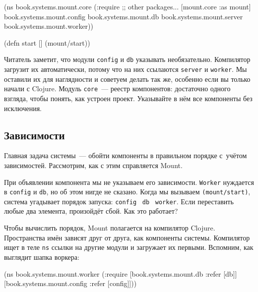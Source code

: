\label{mount-main}

\begin{english}
  \begin{clojure}
(ns book.systems.mount.core
  (:require
   ;; other packages...
   [mount.core :as mount]
   book.systems.mount.config
   book.systems.mount.db
   book.systems.mount.server
   book.systems.mount.worker))

(defn start []
  (mount/start))
  \end{clojure}
\end{english}

Читатель заметит, что модули \verb|config| и \verb|db| указывать
необязательно. Компилятор загрузит их автоматически, потому что на них ссылаются
\verb|server| и \verb|worker|. Мы оставили их для наглядности и советуем делать
так же, особенно если вы только начали с Clojure. Модуль \verb|core|~--- реестр
компонентов: достаточно одного взгляда, чтобы понять, как устроен
проект. Указывайте в нём все компоненты без исключения.

\subsection{Зависимости}


Главная задача системы~--- обойти компоненты в правильном порядке с~учётом
зависимостей. Рассмотрим, как с этим справляется Mount.

При объявлении компонента мы не указываем его зависимости. \verb|Worker|
нуждается в \verb|config| и \verb|db|, но об этом нигде не сказано. Когда мы
вызываем \verb|(mount/start)|, система угадывает порядок запуска:
\verb|config|~\arr{} \verb|db|~\arr{} \verb|worker|. Если переставить любые два
элемента, произойдёт сбой. Как это работает?

Чтобы вычислить порядок, Mount полагается на компилятор Clojure. Пространства
имён зависят друг от друга, как компоненты системы. Компилятор ищет в теле
\verb|ns| ссылки на другие модули и загружает их первыми. Вспомним, как выглядит
шапка воркера:

\ifafive

\begin{english}
  \begin{clojure}
(ns book.systems.mount.worker
  (:require
   [book.systems.mount.db :refer [db]]
   [book.systems.mount.config :refer [config]]))
  \end{clojure}
\end{english}

